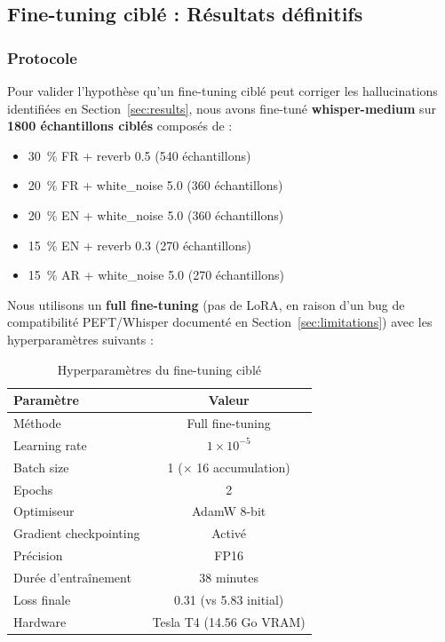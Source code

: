 \documentclass[11pt,a4paper]{article}
\begin{document}
\subsection{Fine-tuning ciblé : Résultats définitifs}
\label{sec:finetuning}

\subsubsection{Protocole}

Pour valider l'hypothèse qu'un fine-tuning ciblé peut corriger les
hallucinations identifiées en Section~\ref{sec:results}, nous avons
fine-tuné \textbf{whisper-medium} sur \textbf{1800 échantillons ciblés}
composés de :

\begin{itemize}
	\item 30~\% FR + reverb 0.5 (540 échantillons)
	\item 20~\% FR + white\_noise 5.0 (360 échantillons)
	\item 20~\% EN + white\_noise 5.0 (360 échantillons)
	\item 15~\% EN + reverb 0.3 (270 échantillons)
	\item 15~\% AR + white\_noise 5.0 (270 échantillons)
\end{itemize}

Nous utilisons un \textbf{full fine-tuning} (pas de LoRA, en raison d'un
bug de compatibilité PEFT/Whisper documenté en Section~\ref{sec:limitations})
avec les hyperparamètres suivants :

\begin{table}[h]
	\centering
	\caption{Hyperparamètres du fine-tuning ciblé}
	\label{tab:finetuning_hyperparams}
	\begin{tabular}{lc}
		\toprule
		\textbf{Paramètre} & \textbf{Valeur} \\
		\midrule
		Méthode & Full fine-tuning \\
		Learning rate & $1 \times 10^{-5}$ \\
		Batch size & 1 ($\times$ 16 accumulation) \\
		Epochs & 2 \\
		Optimiseur & AdamW 8-bit \\
		Gradient checkpointing & Activé \\
		Précision & FP16 \\
		Durée d'entraînement & 38 minutes \\
		Loss finale & 0.31 (vs 5.83 initial) \\
		Hardware & Tesla T4 (14.56 Go VRAM) \\
		\bottomrule
	\end{tabular}
\end{table}
\end{document}
